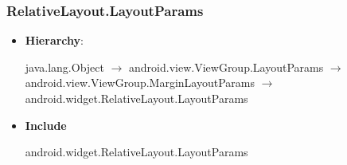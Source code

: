 \documentclass{report}
\begin{document}
    \subsubsection{RelativeLayout.LayoutParams}
    \begin{itemize}
        \item \textbf{Hierarchy}:
            \begin{center}
                java.lang.Object $\to $	android.view.ViewGroup.LayoutParams $\to $	android.view.ViewGroup.MarginLayoutParams $\to $	android.widget.RelativeLayout.LayoutParams
            \end{center}
        \item \textbf{Include}
            \bigbreak \noindent 
            \begin{javacode}
                android.widget.RelativeLayout.LayoutParams
            \end{javacode}


\end{itemize}
\end{document}
